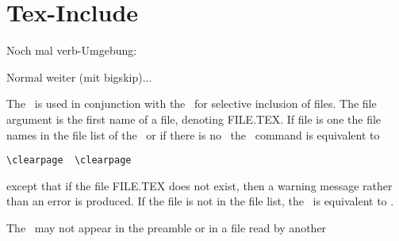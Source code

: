 \section {Tex-Include}

Noch mal verb-Umgebung:

\verb||

Normal weiter (mit bigskip)...

\bigskip

The \ is used in conjunction with the \ for
selective inclusion of files. The file argument is the first name of a file,
denoting FILE.TEX. If file is one the file names in the file list of the
\ or if there is no \ the \
command is equivalent to

\begin{verbatim}
\clearpage  \clearpage
\end{verbatim} 


except that if the file FILE.TEX does not exist, then a warning message
rather than an error is produced. If the file is not in the file list, the
\ is equivalent to \clearpage.

The \ may not appear in the preamble or in a file read by
another \